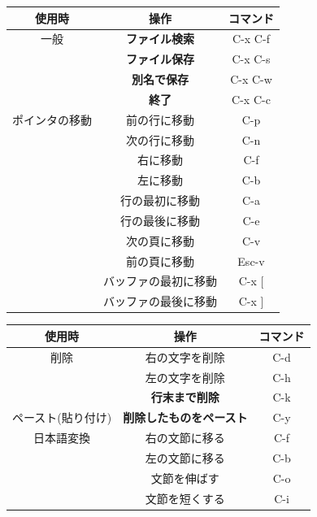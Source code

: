 \documentclass{jarticle}
\begin{document}
\begin{table}[H]
 \begin{minipage}{0.5\hsize}
  \begin{center}
    \begin{tabular}{|c|c|c|}\hline
      使用時 & 操作  & コマンド \\
      \hline
      一般 & {\bf ファイル検索}& C-x C-f  \\
      & {\bf ファイル保存} & C-x C-s  \\
      & {\bf 別名で保存}  & C-x C-w \\
      & {\bf 終了}            & C-x C-c  \\
      ポインタの移動 & 前の行に移動    & C-p \\
      & 次の行に移動    & C-n \\
      & 右に移動          & C-f  \\
      & 左に移動          & C-b  \\
      & 行の最初に移動 & C-a  \\
      & 行の最後に移動 & C-e  \\
      & 次の頁に移動    & C-v  \\
      & 前の頁に移動    & Esc-v     \\
      & バッファの最初に移動 & C-x [ \\
                      & バッファの最後に移動 & C-x ] \\
   \hline
  \end{tabular}
  \end{center}
  \label{table:one}
 \end{minipage}
 \begin{minipage}{0.5\hsize}
  \begin{center}
  \begin{tabular}{|c|c|c|}\hline
    使用時 & 操作  & コマンド \\
  \hline
  削除  & 右の文字を削除 & C-d \\
  & 左の文字を削除 & C-h \\
        	& {\bf 行末まで削除} & C-k \\
          ペースト(貼り付け)   &  {\bf 削除したものをペースト} & C-y \\
日本語変換  & 右の文節に移る  & C-f  \\
                & 左の文節に移る  & C-b \\
                & 文節を伸ばす     & C-o  \\
                & 文節を短くする  & C-i \\

\end{tabular}
\end{center}
\end{minipage}
\end{table}
\end{document}
